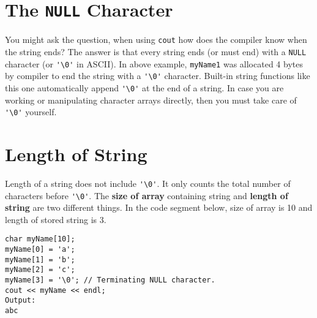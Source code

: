 \documentclass[12pt,a4paper]{article}
\begin{document}
\section{The \texttt{NULL} Character}
You might ask the question, when using \texttt{cout} how does the compiler know when the string ends? The answer is that every string ends (or must end) with a \texttt{NULL} character (or \verb|'\0'| in ASCII). In above example, \texttt{myName1} was allocated 4 bytes by compiler to end the string with a \verb|'\0'| character. Built-in string functions like this one automatically append \verb|'\0'| at the end of a string. In case you are working or manipulating character arrays directly, then you must take care of \verb|'\0'| yourself.
\section{Length of String}
Length of a string does not include \verb|'\0'|. It only counts the total number of characters before \verb|'\0'|. The \textbf{size of array} containing string and \textbf{length of string} are two different things. In the code segment below, size of array is 10 and length of stored string is 3.
\begin{lstlisting}
char myName[10];
myName[0] = 'a';
myName[1] = 'b';
myName[2] = 'c';
myName[3] = '\0'; // Terminating NULL character.
cout << myName << endl;
Output:
abc
\end{lstlisting}
\end{document}
